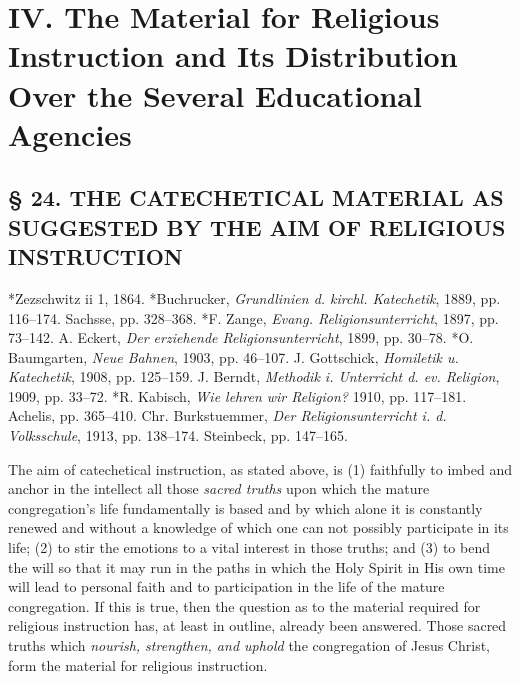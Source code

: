 \part[IV. The Material for Religious Instruction]{IV. The Material for Religious Instruction and Its Distribution Over the Several Educational Agencies}
\chapter[§ 24. THE CATECHETICAL MATERIAL]{§ 24. THE CATECHETICAL MATERIAL AS SUGGESTED BY THE AIM OF RELIGIOUS INSTRUCTION}

*Zezschwitz ii 1, 1864. *Buchrucker, \emph{Grundlinien d. kirchl. Katechetik}, 1889, pp. 116–174. Sachsse, pp. 328–368. *F. Zange, \emph{Evang. Religionsunterricht}, 1897, pp. 73–142. A. Eckert, \emph{Der erziehende Religionsunterricht}, 1899, pp. 30–78. *O. Baumgarten, \emph{Neue Bahnen}, 1903, pp. 46–107. J. Gottschick, \emph{Homiletik u. Katechetik}, 1908, pp. 125–159. J. Berndt, \emph{Methodik i. Unterricht d. ev. Religion}, 1909, pp. 33–72. *R. Kabisch, \emph{Wie lehren wir Religion?} 1910, pp. 117–181. Achelis, pp. 365–410. Chr. Burkstuemmer, \emph{Der Religionsunterricht i. d. Volksschule}, 1913, pp. 138–174. Steinbeck, pp. 147–165.

The aim of catechetical instruction, as stated above, is (1) faithfully to imbed and anchor in the intellect all those \emph{sacred truths} upon which the mature congregation’s life fundamentally is based and by which alone it is constantly renewed and without a knowledge of which one can not possibly participate in its life; (2) to stir the emotions to a vital interest in those truths; and (3) to bend the will so that it may run in the paths in which the Holy Spirit in His own time will lead to personal faith and to participation in the life of the mature congregation. If this is true, then the question as to the material required for religious instruction has, at least in outline, already been answered. Those sacred truths which \emph{nourish, strengthen, and uphold} the congregation of Jesus Christ, form the material for religious instruction.

